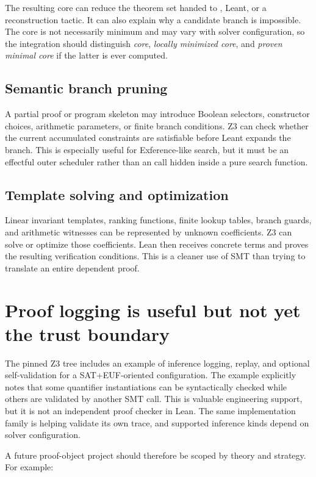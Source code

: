 \documentclass[11pt,letterpaper,openany]{report}
\newcommand{\code}[1]{\texttt{\detokenize{#1}}}
\begin{document}
The resulting core can reduce the theorem set handed to \code{grind}, Leant, or a
reconstruction tactic. It can also explain why a candidate branch is impossible. The
core is not necessarily minimum and may vary with solver configuration, so the
integration should distinguish \emph{core}, \emph{locally minimized core}, and
\emph{proven minimal core} if the latter is ever computed.

\subsection{Semantic branch pruning}

A partial proof or program skeleton may introduce Boolean selectors, constructor
choices, arithmetic parameters, or finite branch conditions. Z3 can check whether the
current accumulated constraints are satisfiable before Leant expands the branch. This
is especially useful for Exference-like search, but it must be an effectful outer
scheduler rather than an \code{unsafePerformIO} call hidden inside a pure search
function.

\subsection{Template solving and optimization}

Linear invariant templates, ranking functions, finite lookup tables, branch guards,
and arithmetic witnesses can be represented by unknown coefficients. Z3 can solve or
optimize those coefficients. Lean then receives concrete terms and proves the
resulting verification conditions. This is a cleaner use of SMT than trying to
translate an entire dependent proof.

\section{Proof logging is useful but not yet the trust boundary}

The pinned Z3 tree includes an example of inference logging, replay, and optional
self-validation for a SAT+EUF-oriented configuration. The example explicitly notes
that some quantifier instantiations can be syntactically checked while others are
validated by another SMT call. This is valuable engineering support, but it is not an
independent proof checker in Lean. The same implementation family is helping validate
its own trace, and supported inference kinds depend on solver configuration.

A future proof-object project should therefore be scoped by theory and strategy. For
example:
\end{document}

